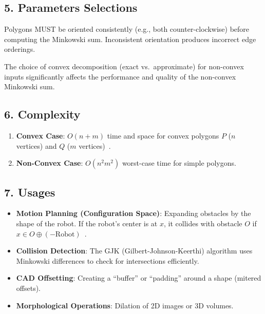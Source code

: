 \subsection{5. Parameters Selections}
\begin{definition}
\label{def:ms_orientation}
Polygons MUST be oriented consistently (e.g., both counter-clockwise) before computing the Minkowski sum. Inconsistent orientation produces incorrect edge orderings.
\end{definition}

\begin{definition}
\label{def:ms_decomposition}
The choice of convex decomposition (exact vs.\ approximate) for non-convex inputs significantly affects the performance and quality of the non-convex Minkowski sum.
\end{definition}

\subsection{6. Complexity}
\begin{theorem}
\label{thm:ms_complexity}
\begin{enumerate}
    \item \textbf{Convex Case}: $O(n+m)$ time and space for convex polygons $P$ ($n$ vertices) and $Q$ ($m$ vertices)~\cite{guibas1987}.
    \item \textbf{Non-Convex Case}: $O(n^2 m^2)$ worst-case time for simple polygons.
\end{enumerate}
\end{theorem}

\subsection{7. Usages}
\begin{itemize}
    \item \textbf{Motion Planning (Configuration Space)}: Expanding obstacles by the shape of the robot. If the robot's center is at $x$, it collides with obstacle $O$ if $x \in O \oplus (-\text{Robot})$~\cite{lozanoperez1983}.
    \item \textbf{Collision Detection}: The GJK (Gilbert-Johnson-Keerthi) algorithm uses Minkowski differences to check for intersections efficiently.
    \item \textbf{CAD Offsetting}: Creating a ``buffer'' or ``padding'' around a shape (mitered offsets).
    \item \textbf{Morphological Operations}: Dilation of 2D images or 3D volumes.
\end{itemize}

